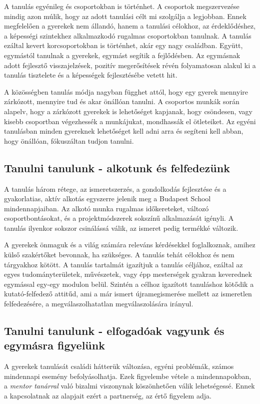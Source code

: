A tanulás egyénileg és csoportokban is történhet. A csoportok megszervezése mindig azon múlik, hogy az adott tanulási célt mi szolgálja a legjobban. Ennek megfelelően a gyerekek nem állandó, hanem a tanulási célokhoz, az érdeklődéshez, a képességi szintekhez alkalmazkodó rugalmas csoportokban tanulnak. A tanulás ezáltal kevert korcsoportokban is történhet, akár egy nagy családban. Együtt, egymástól tanulnak a gyerekek, egymást segítik a fejlődésben. Az egymásnak adott fejlesztő visszajelzések, pozitív megerősítések révén folyamatosan alakul ki a tanulás tisztelete és a képességek fejlesztésébe vetett hit.

A közösségben tanulás módja nagyban függhet attól, hogy egy gyerek mennyire zárkózott, mennyire tud és akar önállóan tanulni. A csoportos munkák során alapelv, hogy a zárkózott gyerekek is lehetőséget kapjanak, hogy csöndesen, vagy kisebb csoportban végezhessék a munkájukat, mondhassák el ötleteiket. Az egyéni tanulásban minden gyereknek lehetőséget kell adni arra és segíteni kell abban, hogy önállóan, fókuszáltan tudjon tanulni.

\subsection{Tanulni tanulunk - alkotunk és felfedezünk}
A tanulás három rétege, az ismeretszerzés, a gondolkodás fejlesztése és a gyakorlatias, aktív alkotás egyszerre jelenik meg a Budapest School mindennapjaiban. Az alkotó munka rugalmas időkereteket, változó csoportbontásokat, és a projektmódszerek sokszínű alkalmazását igényli. A tanulás ilyenkor sokszor csinálássá válik, az ismeret pedig termékké változik.

A gyerekek önmaguk és a világ számára releváns kérdésekkel foglalkoznak, amihez külső szakértőket bevonnak, ha szükséges. A tanulás tehát célokhoz és nem tárgyakhoz kötött. A tanulás tartalmát igazítjuk a tanulás céljához, ezáltal az egyes tudományterületek, művészetek, vagy épp mesterségek gyakran keverednek egymással egy-egy modulon belül. Szintén a célhoz igazított tanuláshoz kötődik a kutató-felfedező attitűd, ami a már ismert újramegismerése mellett az ismeretlen felfedezésére, a megválaszolhatatlan megválaszolására irányul.

\subsection{Tanulni tanulunk - elfogadóak vagyunk és egymásra figyelünk}

A gyerekek tanulását családi hátterük változása, egyéni problémák, számos mindennapi esemény befolyásolhatja. Ezek figyelembe vétele a mindennapokban, a \emph{mentor tanárral} való bizalmi viszonynak köszönhetően válik lehetségessé. Ennek a kapcsolatnak az alapjait ezért a partnerség, az értő figyelem adja.

